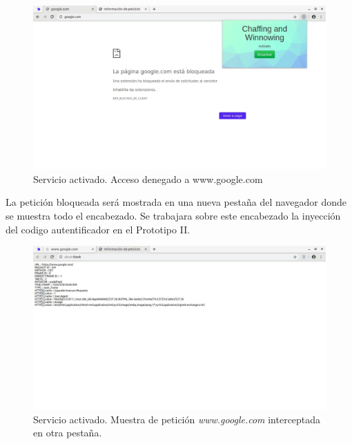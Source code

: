 \documentclass[12pt, a4paper, titlepage]{report}
\begin{document}
        	\begin{figure}[H]
        		\begin{center}	\includegraphics[width=13cm]{./imagenes/Pruebas/Prototipo_1/P_activado1.jpeg}
        			\caption{Servicio activado. Acceso denegado a www.google.com}
        		\end{center}
        	\end{figure}
        	
        	La petición bloqueada será mostrada en una nueva pestaña del navegador donde se muestra todo el encabezado. Se trabajara sobre este encabezado la inyección del codigo autentificador en el Prototipo II.
        	
        	\begin{figure}[H]
        		\begin{center}	\includegraphics[width=13cm]{./imagenes/Pruebas/Prototipo_1/P_activado1_mostrarPeticion.jpeg}
        			\caption[Servicio activado. Muestra de petición \textit{www.google.com}]{Servicio activado. Muestra de petición \textit{www.google.com} interceptada en otra pestaña.}
        		\end{center}
        	\end{figure}
        	
\end{document}
